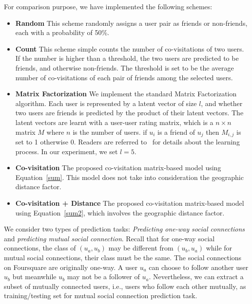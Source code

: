 For comparison purpose, we have implemented the following schemes:
\begin{itemize}
\item \textbf{Random} This scheme randomly assigns a user pair as friends or non-friends, each with a probability of 50\%.

\item \textbf{Count} This scheme simple counts the number of co-visitations of two users. If the number is higher than a threshold, the two users are predicted to be friends, and otherwise non-friends. The threshold is set to be the average number of co-visitations of each pair of friends among the selected users.

\item \textbf{Matrix Factorization} We implement the standard Matrix Factorization~\cite{koren2009matrix} algorithm. Each user is represented by a latent vector of size $l$, and whether two users are friends is predicted by the product of their latent vectors. The latent vectors are learnt with a user-user rating matrix, which is a $n \times n$ matrix $M$ where $n$ is the number of users. if $u_i$ is a friend of $u_j$ then $M_{i,j}$ is set to 1 otherwise 0. Readers are referred to~\cite{koren2009matrix} for details about the learning process. In our experiment, we set $l = 5$.

\item \textbf{Co-visitation} The proposed co-visitation matrix-based model using Equation~\ref{sum}. This model does not take into consideration the geographic distance factor.

\item \textbf{Co-visitation + Distance} The proposed co-visitation matrix-based model using Equation~\ref{sum2}, which involves the geographic distance factor.
\end{itemize}

We consider two types of prediction tasks: \textit{Predicting one-way social connections} and \textit{predicting mutual social connection}. Recall that for one-way social connections, the class of $(u_a, u_b)$ may be different from $(u_b, u_a)$ while for mutual social connections, their class must be the same. The social connections on Foursquare are originally one-way. A user $u_a$ can choose to follow another user $u_b$ but meanwhile $u_b$ may not be a follower of $u_a$. Nevertheless, we can extract a subset of mutually connected users, i.e., users who follow each other mutually, as training/testing set for mutual social connection prediction task.

